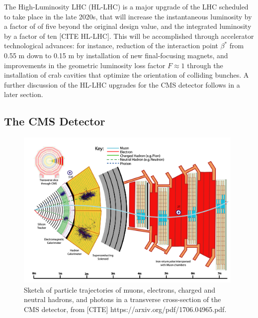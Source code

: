 \documentclass{article}
\begin{document}
The High-Luminosity LHC (HL-LHC) is a major upgrade of the LHC scheduled to take place in the late 2020s, that will increase the instantaneous luminosity by a factor of of five beyond the original design value, and the integrated luminosity by a factor of ten [CITE HL-LHC]. This will be accomplished through accelerator technological advances: for instance, reduction of the interaction point $\beta^*$ from 0.55 m down to 0.15 m by installation of new final-focusing magnets, and improvements in the geometric luminosity loss factor $F \approx 1$ through the installation of crab cavities that optimize the orientation of colliding bunches. A further discussion of the HL-LHC upgrades for the CMS detector follows in a later section.

\subsection{The CMS Detector}
\label{section:cms-detector}

\begin{figure}[ht]
    \centering
    \includegraphics[width=11cm]{figures/sketch-cms-particle-interactions.png}
    \caption{Sketch of particle trajectories of muons, electrons, charged and neutral hadrons, and photons in a transverse cross-section of the CMS detector, from [CITE] https://arxiv.org/pdf/1706.04965.pdf.}
    \label{fig:sketch-cms-particle-interactions}
\end{figure}
\end{document}
